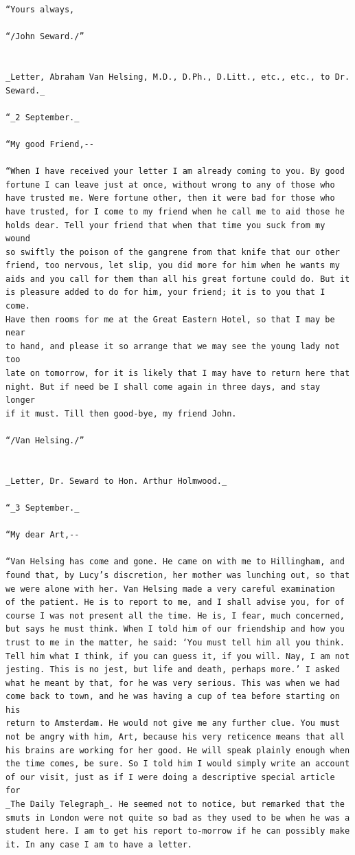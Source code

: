 \documentclass{article}
\begin{document}
\begin{verbatim}
“Yours always,

“/John Seward./”


_Letter, Abraham Van Helsing, M.D., D.Ph., D.Litt., etc., etc., to Dr.
Seward._

“_2 September._

“My good Friend,--

“When I have received your letter I am already coming to you. By good
fortune I can leave just at once, without wrong to any of those who
have trusted me. Were fortune other, then it were bad for those who
have trusted, for I come to my friend when he call me to aid those he
holds dear. Tell your friend that when that time you suck from my wound
so swiftly the poison of the gangrene from that knife that our other
friend, too nervous, let slip, you did more for him when he wants my
aids and you call for them than all his great fortune could do. But it
is pleasure added to do for him, your friend; it is to you that I come.
Have then rooms for me at the Great Eastern Hotel, so that I may be near
to hand, and please it so arrange that we may see the young lady not too
late on tomorrow, for it is likely that I may have to return here that
night. But if need be I shall come again in three days, and stay longer
if it must. Till then good-bye, my friend John.

“/Van Helsing./”


_Letter, Dr. Seward to Hon. Arthur Holmwood._

“_3 September._

“My dear Art,--

“Van Helsing has come and gone. He came on with me to Hillingham, and
found that, by Lucy’s discretion, her mother was lunching out, so that
we were alone with her. Van Helsing made a very careful examination
of the patient. He is to report to me, and I shall advise you, for of
course I was not present all the time. He is, I fear, much concerned,
but says he must think. When I told him of our friendship and how you
trust to me in the matter, he said: ‘You must tell him all you think.
Tell him what I think, if you can guess it, if you will. Nay, I am not
jesting. This is no jest, but life and death, perhaps more.’ I asked
what he meant by that, for he was very serious. This was when we had
come back to town, and he was having a cup of tea before starting on his
return to Amsterdam. He would not give me any further clue. You must
not be angry with him, Art, because his very reticence means that all
his brains are working for her good. He will speak plainly enough when
the time comes, be sure. So I told him I would simply write an account
of our visit, just as if I were doing a descriptive special article for
_The Daily Telegraph_. He seemed not to notice, but remarked that the
smuts in London were not quite so bad as they used to be when he was a
student here. I am to get his report to-morrow if he can possibly make
it. In any case I am to have a letter.


\end{verbatim}
\end{document}
